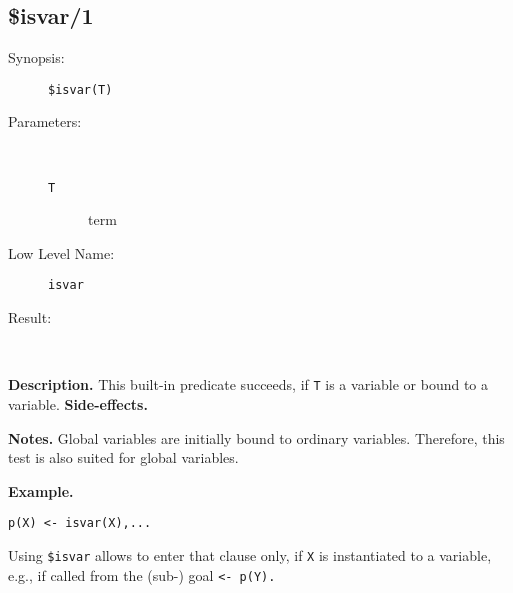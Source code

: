 %
%
%
\subsection{\$isvar/1}

\begin{description}
\item[Synopsis:]
	{\tt \$isvar(T)}
\item[Parameters:]\ \\[-0.5cm]
	\begin{description}
	\item[{\tt T}]
	term
	\end{description}
\item[Low Level Name:]
	{\tt isvar }
\item[Result:]\ \\
\end{description}

\vspace*{0.5cm}
\noindent
{\bf Description.}
This built-in predicate succeeds, if {\tt T} is
a variable or bound to a variable.
\vspace*{0.5cm}
\noindent
{\bf Side-effects.}

\vspace*{0.5cm}
\noindent
{\bf Notes.}
Global variables are initially bound to ordinary variables.
Therefore, this test is also suited for global variables.

\vspace*{0.5cm}
\noindent
{\bf Example.}
\begin{verbatim}
p(X) <- isvar(X),...
\end{verbatim}

Using {\tt \$isvar} allows to enter that clause only, if {\tt X} is
instantiated to a variable, e.g., if called from the (sub-) goal
{\tt <- p(Y).}


